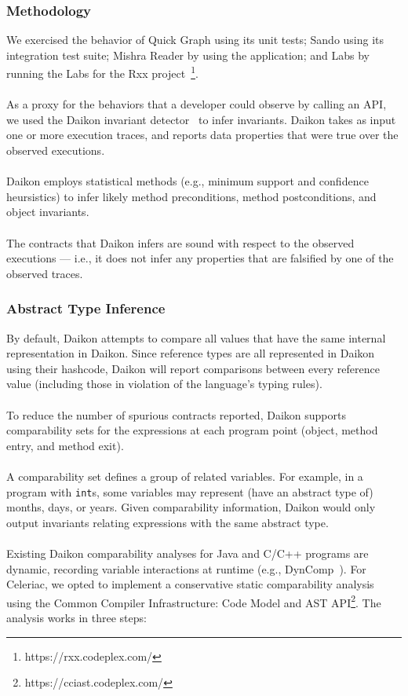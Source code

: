 \subsubsection{Methodology}

We exercised the behavior of Quick Graph using its unit tests; Sando
using its integration test suite; Mishra Reader by using the
application; and Labs by running the Labs for the Rxx
project~\footnote{https://rxx.codeplex.com/}.
\\ \\
As a proxy for the behaviors that a developer could observe by calling
an API, we used the Daikon invariant detector~\cite{daikon}
to infer invariants. Daikon takes as input one or more execution
traces, and reports data properties that were true over the observed
executions.
\\ \\
Daikon employs statistical methods (e.g., minimum support and
confidence heursistics) to infer likely method preconditions, method
postconditions, and object invariants.
\\ \\
The contracts that Daikon infers are sound with respect to the
observed executions --- i.e., it does not infer any properties that
are falsified by one of the observed traces.
%

\subsubsection{Abstract Type Inference}
\label{sec:comparability}

By default, Daikon attempts to compare all values that have the same
internal representation in Daikon. Since reference types are all
represented in Daikon using their hashcode, Daikon will report
comparisons between every reference value (including those in
violation of the language's typing rules).
\\ \\
To reduce the number of spurious contracts reported, Daikon supports
comparability sets for the expressions at each program point (object,
method entry, and method exit).
\\ \\
A comparability set defines a group of related variables. For example,
in a program with \verb|int|s, some variables may represent (have an
abstract type of) months, days, or years. Given comparability
information, Daikon would only output invariants relating expressions
with the same abstract type.
\\ \\
Existing Daikon comparability analyses for Java and C/C++ programs are
dynamic, recording variable interactions at runtime
(e.g., DynComp~). For Celeriac, we opted to implement a
conservative static comparability analysis using the Common Compiler
Infrastructure: Code Model and AST
API\footnote{https://cciast.codeplex.com/}. The analysis works in
three steps:

